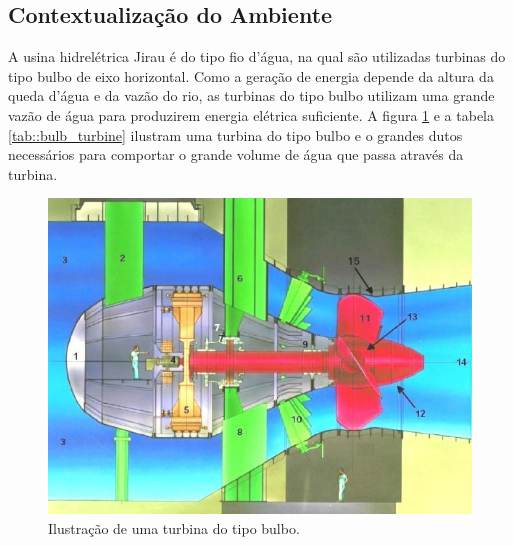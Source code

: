 \subsection{Contextualização do Ambiente}\label{sec::desc_contex}

A usina hidrelétrica Jirau é do tipo fio d'água, na qual são utilizadas turbinas
do tipo bulbo de eixo horizontal. Como a geração de energia depende da altura da queda d'água e da vazão do rio, as turbinas do tipo bulbo utilizam uma grande vazão de
água para produzirem energia elétrica suficiente. A figura
\ref{fig::bulb_turbine} e a tabela \ref{tab::bulb_turbine} ilustram uma turbina
do tipo bulbo e o grandes dutos necessários para comportar o grande volume de água que passa através da turbina. 
 
\begin{figure}[h!]	
	\includegraphics[width=\columnwidth]{sota/figs/intro/bulb_turbine2}
	\caption{Ilustração de uma turbina do tipo bulbo.}
	\label{fig::bulb_turbine}
\end{figure}

